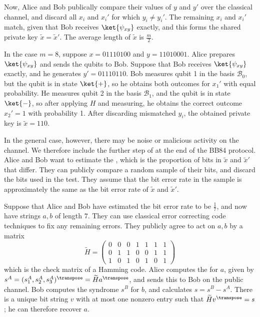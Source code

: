 Now, Alice and Bob publically compare their values of $y$ and $y'$ over the classical channel, and discard all $x_i$ and $x_i'$ for which $y_i \neq y_i'$.
The remaining $x_i$ and $x_i'$ match, given that Bob receives $\ket{\psi_{xy}}$ exactly, and this forms the shared private key $\widetilde x = \widetilde x'$.
The average length of $\widetilde x$ is $\frac{m}{2}$.

In the case $m = 8$, suppose $x = 01110100$ and $y = 11010001$.
Alice prepares $\ket{\psi_{xy}}$ and sends the qubits to Bob.
Suppose that Bob receives $\ket{\psi_{xy}}$ exactly, and he generates $y' = 01110110$.
Bob measures qubit 1 in the basis $\mathcal B_0$, but the qubit is in state $\ket{+}$, so he obtains both outcomes for $x_1'$ with equal probability.
He measures qubit 2 in the basis $\mathcal B_1$, and the qubit is in state $\ket{-}$, so after applying $H$ and measuring, he obtains the correct outcome $x_2' = 1$ with probability 1.
After discarding mismatched $y_i$, the obtained private key is $\widetilde x = 110$.

In the general case, however, there may be noise or malicious activity on the channel.
We therefore include the further step of  at the end of the BB84 protocol.
Alice and Bob want to estimate the , which is the proportion of bits in $\widetilde x$ and $\widetilde x'$ that differ.
They can publicly compare a random sample of their bits, and discard the bits used in the test.
They assume that the bit error rate in the sample is approximately the same as the bit error rate of $\widetilde x$ and $\widetilde x'$.

Suppose that Alice and Bob have estimated the bit error rate to be $\frac{1}{7}$, and now have strings $a, b$ of length $7$.
They can use classical error correcting code techniques to fix any remaining errors.
They publicly agree to act on $a, b$ by a matrix
\[ \widetilde H = \begin{pmatrix}
    0 & 0 & 0 & 1 & 1 & 1 & 1 \\
    0 & 1 & 1 & 0 & 0 & 1 & 1 \\
    1 & 0 & 1 & 0 & 1 & 0 & 1
\end{pmatrix} \]
which is the check matrix of a Hamming code.
Alice computes the  for $a$, given by $s^A = (s_1^A, s_2^A, s_3^A)^\transpose = \widetilde H a^\transpose$, and sends this to Bob on the public channel.
Bob computes the syndrome $s^B$ for $b$, and calculates $s = s^B - s^A$.
There is a unique bit string $v$ with at most one nonzero entry such that $\widetilde H v^\transpose = s$; he can therefore recover $a$.

